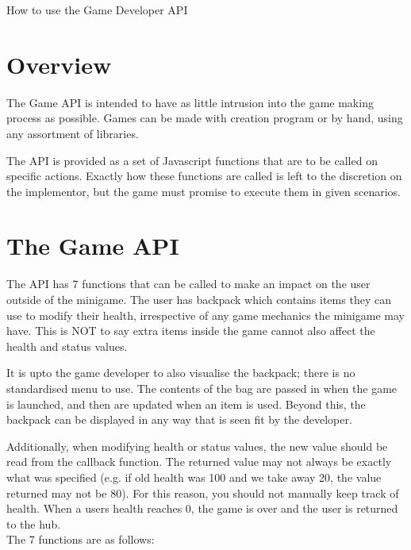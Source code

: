 \documentclass[a4paper,12pt]{article}
\begin{document}
\begin{center}
{\Huge How to use the Game Developer API}
\end{center}


\section{Overview}


The Game API is intended to have as little intrusion into the game making process as possible.
Games can be made with creation program or by hand, using any assortment of libraries.

The API is provided as a set of Javascript functions that are to be called on specific actions.
Exactly how these functions are called is left to the discretion on the implementor, but the game
must promise to execute them in given scenarios.


\section{The Game API}

The API has 7 functions that can be called to make an impact on the user outside of the minigame.
The user has backpack which contains items they can use to modify their health, irrespective of any game mechanics
the minigame may have. This is NOT to say extra items inside the game cannot also affect the health and status values.

It is upto the game developer to also visualise the backpack; there is no standardised menu to use. The contents of the bag
are passed in when the game is launched, and then are updated when an item is used. Beyond this, the backpack can be displayed
in any way that is seen fit by the developer.

Additionally, when modifying health or status values, the new value should be read from the callback function.
The returned value may not always be exactly what was specified (e.g. if old health was 100 and we take away 
20, the value returned may not be 80). For this reason, you should not manually keep track of health. 
When a users health reaches 0, the game is over and the user is returned to the hub.
\\
The 7 functions are as follows:
\end{document}
